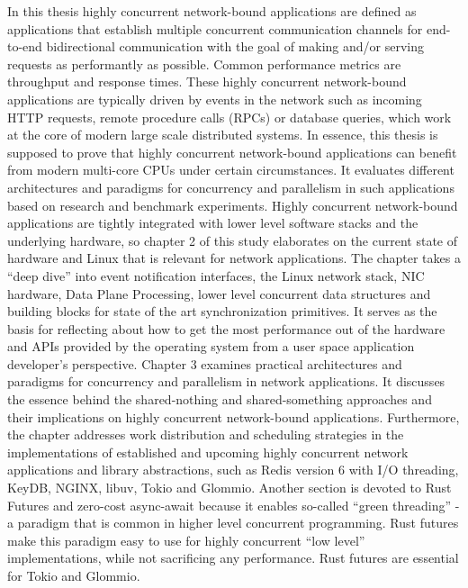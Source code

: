 In this thesis highly concurrent network-bound applications are defined as applications that establish multiple concurrent communication channels for end-to-end bidirectional communication with the goal of making and/or serving requests as performantly as possible. Common performance metrics are throughput and response times. These highly concurrent network-bound applications are typically driven by events in the network such as incoming HTTP requests, remote procedure calls (RPCs) or database queries, which work at the core of modern large scale distributed systems. \newline
In essence, this thesis is supposed to prove that highly concurrent network-bound applications can benefit from modern multi-core CPUs under certain circumstances. It evaluates different architectures and paradigms for concurrency and parallelism in such applications based on research and benchmark experiments. \newline
Highly concurrent network-bound applications are tightly integrated with lower level software stacks and the underlying hardware, so chapter 2 of this study elaborates on the current state of hardware and Linux that is relevant for network applications. The chapter takes a “deep dive” into event notification interfaces, the Linux network stack, NIC hardware, Data Plane Processing, lower level concurrent data structures and building blocks for state of the art synchronization primitives. It serves as the basis for reflecting about how to get the most performance out of the hardware and APIs provided by the operating system from a user space application developer’s perspective. \newline
Chapter 3 examines practical architectures and paradigms for concurrency and parallelism in network applications. It discusses the essence behind the shared-nothing and shared-something approaches and their implications on highly concurrent network-bound applications. Furthermore, the chapter addresses work distribution and scheduling strategies in the implementations of established and upcoming highly concurrent network applications and library abstractions, such as Redis version 6 with I/O threading, KeyDB, NGINX, libuv, Tokio and Glommio. Another section is devoted to Rust Futures and zero-cost async-await because it enables so-called “green threading” - a paradigm that is common in higher level concurrent programming. Rust futures make this paradigm easy to use for highly concurrent “low level” implementations, while not sacrificing any performance. Rust futures are essential for Tokio and Glommio.
